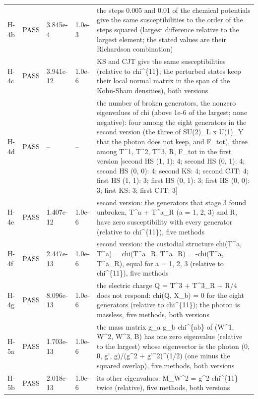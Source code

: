 \documentclass[aps,prd,onecolumn,superscriptaddress,nofootinbib,floatfix,longbibliography]{revtex4-2}
\begin{document}
\begin{longtable}{p{}p{}p{}p{}p{}}
H-4b & PASS & 3.845e-4 & 1.0e-3 & the steps 0.005 and 0.01 of the chemical potentials give the same susceptibilities to the order of the steps squared (largest difference relative to the largest element; the stated values are their Richardson combination) \\
H-4c & PASS & 3.941e-12 & 1.0e-6 & KS and CJT give the same susceptibilities (relative to chi\textasciicircum{}\{11\}; the perturbed states keep their local normal matrix in the span of the Kohn-Sham densities), both versions \\
H-4d & PASS & -- & -- & the number of broken generators, the nonzero eigenvalues of chi (above 1e-6 of the largest; none negative): four among the eight generators in the second version (the three of SU(2)\_L x U(1)\_Y that the photon does not keep, and F\_tot), three among T\textasciicircum{}1, T\textasciicircum{}2, T\textasciicircum{}3, R, F\_tot in the first version [second HS (1, 1): 4; second HS (0, 1): 4; second HS (0, 0): 4; second KS: 4; second CJT: 4; first HS (1, 1): 3; first HS (0, 1): 3; first HS (0, 0): 3; first KS: 3; first CJT: 3] \\
H-4e & PASS & 1.407e-12 & 1.0e-6 & second version: the generators that stage 3 found unbroken, T\textasciicircum{}a + T\textasciicircum{}a\_R (a = 1, 2, 3) and R, have zero susceptibility with every generator (relative to chi\textasciicircum{}\{11\}), five methods \\
H-4f & PASS & 2.447e-13 & 1.0e-6 & second version: the custodial structure chi(T\textasciicircum{}a, T\textasciicircum{}a) = chi(T\textasciicircum{}a\_R, T\textasciicircum{}a\_R) = -chi(T\textasciicircum{}a, T\textasciicircum{}a\_R), equal for a = 1, 2, 3 (relative to chi\textasciicircum{}\{11\}), five methods \\
H-4g & PASS & 8.096e-13 & 1.0e-6 & the electric charge Q = T\textasciicircum{}3 + T\textasciicircum{}3\_R + R/4 does not respond: chi(Q, X\_b) = 0 for the eight generators (relative to chi\textasciicircum{}\{11\}); the photon is massless, five methods, both versions \\
H-5a & PASS & 1.703e-13 & 1.0e-6 & the mass matrix g\_a g\_b chi\textasciicircum{}\{ab\} of (W\textasciicircum{}1, W\textasciicircum{}2, W\textasciicircum{}3, B) has one zero eigenvalue (relative to the largest) whose eigenvector is the photon (0, 0, g', g)/(g\textasciicircum{}2 + g'\textasciicircum{}2)\textasciicircum{}(1/2) (one minus the squared overlap), five methods, both versions \\
H-5b & PASS & 2.018e-13 & 1.0e-6 & its other eigenvalues: M\_W\textasciicircum{}2 = g\textasciicircum{}2 chi\textasciicircum{}\{11\} twice (relative), five methods, both versions \\

\end{longtable}
\end{document}

